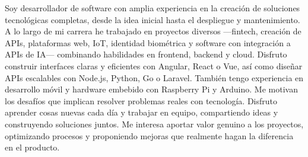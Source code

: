 %
%
%
\par{
\begin{spacing}{1.20}Soy desarrollador de software con amplia experiencia en la creación de soluciones tecnológicas completas, desde la idea inicial hasta el despliegue y mantenimiento. A lo largo de mi carrera he trabajado en proyectos diversos —fintech, creación de APIs, plataformas web, IoT, identidad biométrica y software con integración a APIs de IA— combinando habilidades en frontend, backend y cloud. Disfruto construir interfaces claras y eficientes con Angular, React o Vue, así como diseñar APIs escalables con Node.js, Python, Go o Laravel. También tengo experiencia en desarrollo móvil y hardware embebido con Raspberry Pi y Arduino. Me motivan los desafíos que implican resolver problemas reales con tecnología. Disfruto aprender cosas nuevas cada día y trabajar en equipo, compartiendo ideas y construyendo soluciones juntos. Me interesa aportar valor genuino a los proyectos, optimizando procesos y proponiendo mejoras que realmente hagan la diferencia en el producto.\end{spacing}
}